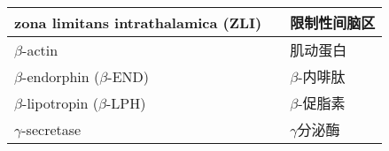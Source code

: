 \begin{longtable}{lll}
	\midrule
	zona limitans intrathalamica (ZLI) && 限制性间脑区  \\
	
	\midrule
	$\beta$-actin && 肌动蛋白  \\
	
	\midrule
	$\beta$-endorphin ($\beta$-END) && $\beta$-内啡肽  \\
	
	\midrule
	$\beta$-lipotropin ($\beta$-LPH) && $\beta$-促脂素  \\
	
	\midrule
	$\gamma$-secretase && $\gamma$分泌酶  \\
	
	
	
	\bottomrule  

\end{longtable}


